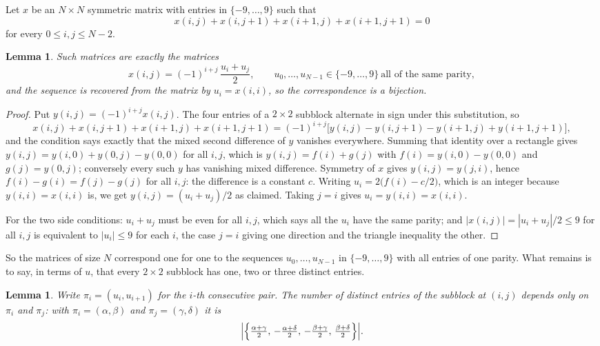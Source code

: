 \documentclass[11pt,a4paper]{article}
\theoremstyle{plain}
\newtheorem{lemma}[theorem]{Lemma}
\theoremstyle{definition}
\begin{document}
Let $x$ be an $N\times N$ symmetric matrix with entries in $\{-9,\dots,9\}$ such that
\[
x(i,j)+x(i,j{+}1)+x(i{+}1,j)+x(i{+}1,j{+}1)=0
\]
for every $0\le i,j\le N-2$.

\begin{lemma}\label{lem:solve}
Such matrices are exactly the matrices
\[
x(i,j)=(-1)^{i+j}\,\frac{u_i+u_j}{2},
\qquad u_0,\dots,u_{N-1}\in\{-9,\dots,9\}\ \text{all of the same parity},
\]
and the sequence is recovered from the matrix by $u_i=x(i,i)$, so the correspondence is a
bijection.
\end{lemma}

\begin{proof}
Put $y(i,j)=(-1)^{i+j}x(i,j)$. The four entries of a $2\times2$ subblock alternate in sign
under this substitution, so
\[
x(i,j)+x(i,j{+}1)+x(i{+}1,j)+x(i{+}1,j{+}1)
=(-1)^{i+j}\bigl[y(i,j)-y(i,j{+}1)-y(i{+}1,j)+y(i{+}1,j{+}1)\bigr],
\]
and the condition says exactly that the mixed second difference of $y$ vanishes everywhere.
Summing that identity over a rectangle gives
$y(i,j)=y(i,0)+y(0,j)-y(0,0)$ for all $i,j$, which is $y(i,j)=f(i)+g(j)$ with
$f(i)=y(i,0)-y(0,0)$ and $g(j)=y(0,j)$; conversely every such $y$ has vanishing mixed
difference. Symmetry of $x$ gives $y(i,j)=y(j,i)$, hence $f(i)-g(i)=f(j)-g(j)$ for all $i,j$:
the difference is a constant $c$. Writing $u_i=2\bigl(f(i)-c/2\bigr)$, which is an integer
because $y(i,i)=x(i,i)$ is, we get $y(i,j)=(u_i+u_j)/2$ as claimed. Taking $j=i$ gives
$u_i=y(i,i)=x(i,i)$.

For the two side conditions: $u_i+u_j$ must be even for all $i,j$, which says all the $u_i$ have
the same parity; and $|x(i,j)|=|u_i+u_j|/2\le9$ for all $i,j$ is equivalent to $|u_i|\le9$
for each $i$, the case $j=i$ giving one direction and the triangle inequality the other.
\end{proof}

So the matrices of size $N$ correspond one for one to the sequences $u_0,\dots,u_{N-1}$ in
$\{-9,\dots,9\}$ with all entries of one parity. What remains is to say, in terms of $u$,
that every $2\times2$ subblock has one, two or three distinct entries.

\begin{lemma}\label{lem:block}
Write $\pi_i=(u_i,u_{i+1})$ for the $i$-th consecutive pair. The number of distinct entries of
the subblock at $(i,j)$ depends only on $\pi_i$ and $\pi_j$: with $\pi_i=(\alpha,\beta)$ and
$\pi_j=(\gamma,\delta)$ it is
\[
\Bigl|\Bigl\{\tfrac{\alpha+\gamma}{2},\,-\tfrac{\alpha+\delta}{2},\,
-\tfrac{\beta+\gamma}{2},\,\tfrac{\beta+\delta}{2}\Bigr\}\Bigr| .
\]
\end{lemma}
\end{document}
